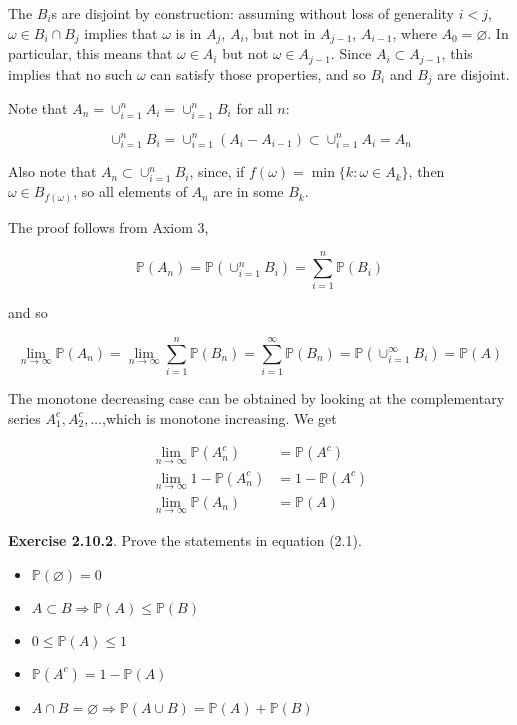 The \(B_{i}\)s are disjoint by construction: assuming without loss of generality \(i < j\), \(\omega \in B_{i} \cap B_{j}\) implies that \(\omega\) is in \(A_{j}\), \(A_{i}\), but not in \(A_{j - 1}\), \(A_{i - 1}\), where \(A_{0} = \varnothing\). In particular, this means that \(\omega \in A_{i}\) but not \(\omega \in A_{j - 1}\). Since \(A_{i} \subset A_{j - 1}\), this implies that no such \(\omega\) can satisfy those properties, and so \(B_{i}\) and \(B_{j}\) are disjoint.

Note that \(A_{n} = \cup_{i=1}^{n} A_{i} = \cup_{i=1}^{n} B_{i}\) for all \(n\):

\[ \cup_{i=1}^{n} B_{i} = \cup_{i=1}^{n} (A_{i} - A_{i - 1}) \subset \cup_{i=1}^{n} A_{i} = A_{n} \]

Also note that \(A_{n} \subset \cup_{i=1}^{n} B_{i}\), since, if
 \(f(\omega) = \min \{ k : \omega \in A_{k} \}\), then \(\omega \in B_{f(\omega)}\), so all elements of \(A_{n}\) are in some \(B_{k}\).

The proof follows from Axiom 3,

\[ \mathbb{P}(A_{n}) = \mathbb{P}\left( \cup_{i=1}^{n} B_{i} \right) = \sum_{i=1}^{n} \mathbb{P}(B_{i}) \]

and so

\[ \lim_{n \rightarrow \infty} \mathbb{P}(A_{n}) = \lim_{n \rightarrow \infty} \sum_{i=1}^{n} \mathbb{P}(B_{n}) = \sum_{i=1}^{\infty} \mathbb{P}(B_{n}) = \mathbb{P}\left( \cup_{i=1}^{\infty} B_{i} \right) = \mathbb{P}(A) \]

The monotone decreasing case can be obtained by looking at the complementary series \(A_{1}^{c}, A_{2}^{c}, \dots\),which is monotone increasing. We get

\begin{align*}
\lim_{n \rightarrow \infty} \mathbb{P}(A_{n}^{c}) 
&= \mathbb{P}(A^{c}) 
\\
\lim_{n \rightarrow \infty} 1 - \mathbb{P}(A_{n}^{c}) 
&= 1 - \mathbb{P}(A^{c}) 
\\
\lim_{n \rightarrow \infty} \mathbb{P}(A_{n}) 
&= \mathbb{P}(A)
\end{align*}

\textbf{Exercise 2.10.2}. Prove the statements in equation (2.1).

\begin{itemize}[tightlist]
\item
  \(\mathbb{P}(\varnothing) = 0\)
\item
  \(A \subset B \Rightarrow \mathbb{P}(A) \leq \mathbb{P}(B)\)
\item
  \(0 \leq \mathbb{P}(A) \leq 1\)
\item
  \(\mathbb{P}\left(A^{c}\right) = 1 - \mathbb{P}(A)\)
\item
  \(A \cap B = \varnothing \Rightarrow \mathbb{P}(A \cup B) = \mathbb{P}(A) + \mathbb{P}(B)\)
\end{itemize}

